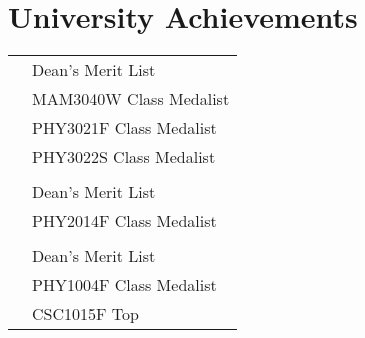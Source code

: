 
\section{University Achievements}

\begin{tabular}{R{2.5cm}|l}
   & Dean's Merit List\\
     & MAM3040W Class Medalist\\
     & PHY3021F Class Medalist\\
     & PHY3022S Class Medalist\\
     & \\
   & Dean's Merit List\\
     & PHY2014F Class Medalist\\
     & \\
   & Dean's Merit List\\
     & PHY1004F Class Medalist\\
     & CSC1015F Top \\
\end{tabular}


